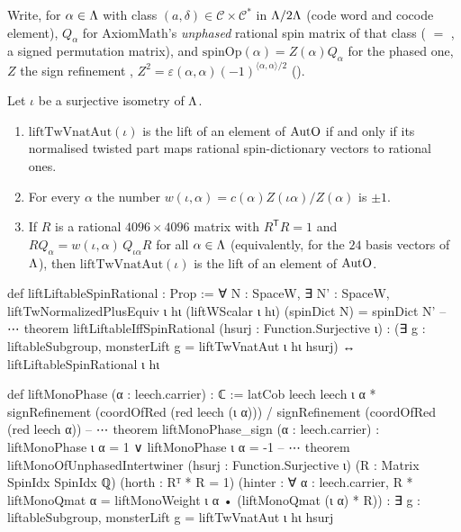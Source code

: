 Write, for $\alpha\in{\Lambda}$ with class $(a,\delta)\in\mathcal C\times\mathcal C^*$ in ${\Lambda}/2{\Lambda}$ (code word and cocode
element), $Q_\alpha$ for AxiomMath's \emph{unphased} rational spin matrix of that class ( $=$
, a signed permutation matrix), and $\mathrm{spinOp}(\alpha)=Z(\alpha)Q_\alpha$ for the phased one,
$Z$ the sign refinement , $Z^2=\varepsilon(\alpha,\alpha)(-1)^{\langle\alpha,\alpha\rangle/2}$
().

\begin{theorem}\label{ch22:thm:criterion}
Let $\iota$ be a surjective isometry of ${\Lambda}$.
\begin{enumerate}[label=(\alph*)]
\item $\mathrm{liftTwVnatAut}(\iota)$ is the lift of an element of $\mathrm{AutO}$ if and only if its normalised
  twisted part maps rational spin-dictionary vectors to rational ones.
\item For every $\alpha$ the number $w(\iota,\alpha)=c(\alpha)Z(\iota\alpha)/Z(\alpha)$ is $\pm1$.
\item If $R$ is a rational $4096\times4096$ matrix with $R^{\mathsf T}R=1$ and $RQ_\alpha=w(\iota,\alpha)\,Q_{\iota\alpha}R$
  for all $\alpha\in{\Lambda}$ (equivalently, for the $24$ basis vectors of ${\Lambda}$), then $\mathrm{liftTwVnatAut}(\iota)$ is
  the lift of an element of $\mathrm{AutO}$.
\end{enumerate}
\end{theorem}
\begin{leancode}
def liftLiftableSpinRational : Prop :=
  ∀ N : SpaceW, ∃ N' : SpaceW,
    liftTwNormalizedPlusEquiv ι hι (liftWScalar ι hι) (spinDict N) = spinDict N'
-- ⋯
theorem liftLiftableIffSpinRational (hsurj : Function.Surjective ι) :
    (∃ g : liftableSubgroup, monsterLift g = liftTwVnatAut ι hι hsurj) ↔
      liftLiftableSpinRational ι hι
\end{leancode}
\begin{leancode}
def liftMonoPhase (α : leech.carrier) : ℂ :=
  latCob leech leech ι α * signRefinement (coordOfRed (red leech (ι α))) /
    signRefinement (coordOfRed (red leech α))
-- ⋯
theorem liftMonoPhase_sign (α : leech.carrier) :
    liftMonoPhase ι α = 1 ∨ liftMonoPhase ι α = -1
-- ⋯
theorem liftMonoOfUnphasedIntertwiner (hsurj : Function.Surjective ι)
    (R : Matrix SpinIdx SpinIdx ℚ) (horth : Rᵀ * R = 1)
    (hinter : ∀ α : leech.carrier,
      R * liftMonoQmat α = liftMonoWeight ι α • (liftMonoQmat (ι α) * R)) :
    ∃ g : liftableSubgroup, monsterLift g = liftTwVnatAut ι hι hsurj
\end{leancode}
